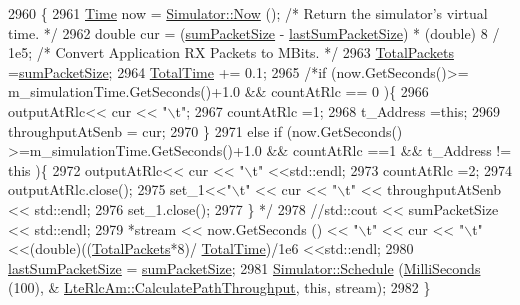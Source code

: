 \begin{DoxyCode}
2960 \{
2961   \hyperlink{namespacens3_1_1TracedValueCallback_a7ffd3e7c142ffe7c8a1d2db9b8de38ec}{Time} now = \hyperlink{classns3_1_1Simulator_ac3178fa975b419f7875e7105be122800}{Simulator::Now} ();                                         \textcolor{comment}{/* Return the
       simulator's virtual time. */}
2962   \textcolor{keywordtype}{double} cur = (\hyperlink{classns3_1_1LteRlcAm_ad22cb06ab4ce74b0749390193dfb7dfb}{sumPacketSize} - \hyperlink{classns3_1_1LteRlcAm_a37135b151c291c00f8d0345f8f442561}{lastSumPacketSize}) * (\textcolor{keywordtype}{double}) 8 / 1e5;     \textcolor{comment}{/*
       Convert Application RX Packets to MBits. */}
2963 \hyperlink{classns3_1_1LteRlcAm_a1b03629adba01263bcdb8a64606eddea}{TotalPackets} =\hyperlink{classns3_1_1LteRlcAm_ad22cb06ab4ce74b0749390193dfb7dfb}{sumPacketSize};
2964 \hyperlink{classns3_1_1LteRlcAm_a7ea7ad8fc456ed782e8d18b33ece017b}{TotalTime} += 0.1;
2965 \textcolor{comment}{/*if (now.GetSeconds()>= m\_simulationTime.GetSeconds()+1.0 && countAtRlc == 0 )\{}
2966 \textcolor{comment}{        outputAtRlc<< cur << "\(\backslash\)t";}
2967 \textcolor{comment}{        countAtRlc =1;}
2968 \textcolor{comment}{        t\_Address =this;}
2969 \textcolor{comment}{        throughputAtSenb = cur;}
2970 \textcolor{comment}{\}}
2971 \textcolor{comment}{else if (now.GetSeconds() >=m\_simulationTime.GetSeconds()+1.0 && countAtRlc ==1 && t\_Address != this )\{}
2972 \textcolor{comment}{        outputAtRlc<< cur << "\(\backslash\)t" <<std::endl;}
2973 \textcolor{comment}{        countAtRlc =2;}
2974 \textcolor{comment}{        outputAtRlc.close();}
2975 \textcolor{comment}{        set\_1<<"\(\backslash\)t" << cur << "\(\backslash\)t" << throughputAtSenb << std::endl;}
2976 \textcolor{comment}{    set\_1.close();}
2977 \textcolor{comment}{\} */}
2978 \textcolor{comment}{//std::cout << sumPacketSize << std::endl;}
2979   *stream << now.GetSeconds () << \textcolor{stringliteral}{"\(\backslash\)t"} << cur << \textcolor{stringliteral}{"\(\backslash\)t"}<<(double)((\hyperlink{classns3_1_1LteRlcAm_a1b03629adba01263bcdb8a64606eddea}{TotalPackets}*8)/
      \hyperlink{classns3_1_1LteRlcAm_a7ea7ad8fc456ed782e8d18b33ece017b}{TotalTime})/1e6 <<std::endl;
2980   \hyperlink{classns3_1_1LteRlcAm_a37135b151c291c00f8d0345f8f442561}{lastSumPacketSize} = \hyperlink{classns3_1_1LteRlcAm_ad22cb06ab4ce74b0749390193dfb7dfb}{sumPacketSize};
2981   \hyperlink{classns3_1_1Simulator_a671882c894a08af4a5e91181bf1eec13}{Simulator::Schedule} (\hyperlink{group__timecivil_gaf26127cf4571146b83a92ee18679c7a9}{MilliSeconds} (100), &
      \hyperlink{classns3_1_1LteRlcAm_ab0667dd0c5a687aeb730b0cdbcf25822}{LteRlcAm::CalculatePathThroughput}, \textcolor{keyword}{this}, stream);
2982 \}
\end{DoxyCode}


